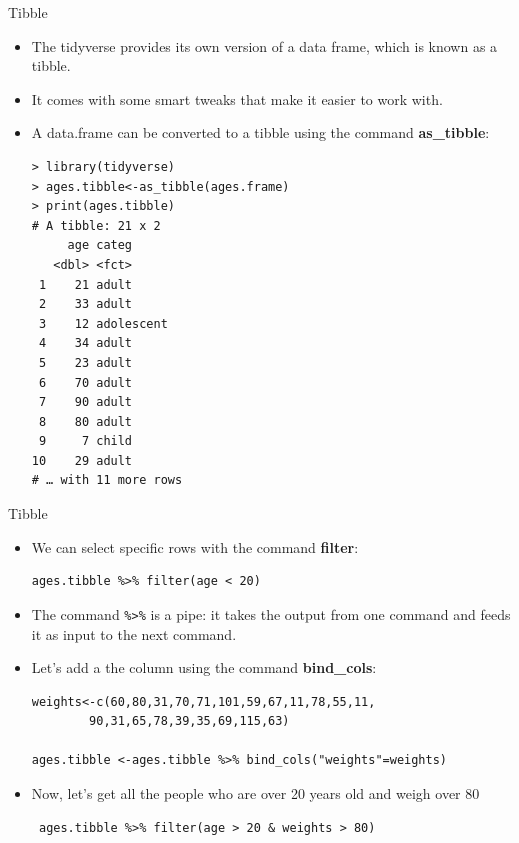 \documentclass[handout]{beamer}
\begin{document}
\begin{frame}[fragile]{Tibble}
\scriptsize{
\begin{itemize}
 \item The tidyverse provides its own version of a data frame, which is known as a tibble.
 \item It comes with some smart tweaks that make it easier to work with.
 \item A data.frame can be converted to a tibble using the command \textbf{as\_tibble}:
 \begin{verbatim}
> library(tidyverse)
> ages.tibble<-as_tibble(ages.frame)
> print(ages.tibble)
# A tibble: 21 x 2
     age categ     
   <dbl> <fct>     
 1    21 adult     
 2    33 adult     
 3    12 adolescent
 4    34 adult     
 5    23 adult     
 6    70 adult     
 7    90 adult     
 8    80 adult     
 9     7 child     
10    29 adult     
# … with 11 more rows
 \end{verbatim}

 
 
\end{itemize}



}
\end{frame}


\begin{frame}[fragile]{Tibble}
\scriptsize{
\begin{itemize}
 \item We can select specific rows with the command \textbf{filter}:
 \begin{verbatim}
ages.tibble %>% filter(age < 20)
 \end{verbatim}
\item The command \verb+%>%+ is a pipe: it takes the output from one command and feeds it as input to the next command.
 
\item Let's add a the column using the command \textbf{bind\_cols}:
 
 \begin{verbatim}
weights<-c(60,80,31,70,71,101,59,67,11,78,55,11,
        90,31,65,78,39,35,69,115,63)

ages.tibble <-ages.tibble %>% bind_cols("weights"=weights)   
 \end{verbatim}
 
\item Now, let's get all the people who are over 20 years old and weigh over 80
 \begin{verbatim}
 ages.tibble %>% filter(age > 20 & weights > 80) 
 \end{verbatim}



\end{itemize}



}
\end{frame}
\end{document}
